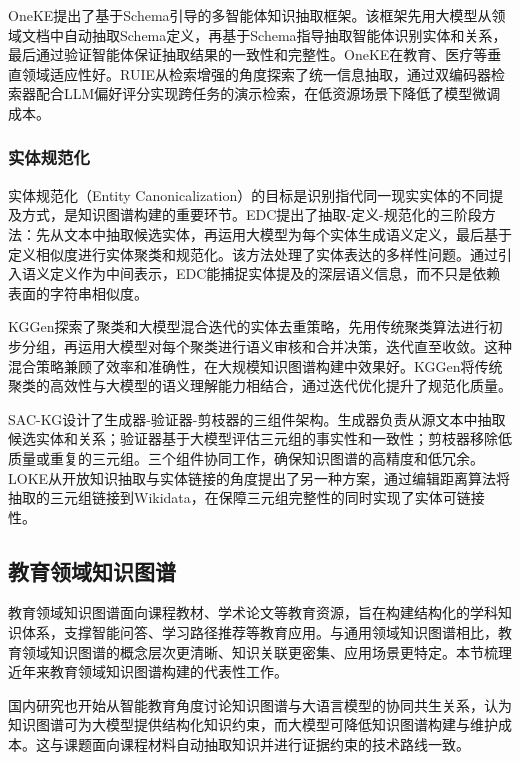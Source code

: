 OneKE提出了基于Schema引导的多智能体知识抽取框架\cite{oneke_2025}。该框架先用大模型从领域文档中自动抽取Schema定义，再基于Schema指导抽取智能体识别实体和关系，最后通过验证智能体保证抽取结果的一致性和完整性。OneKE在教育、医疗等垂直领域适应性好。RUIE\cite{ruie_2024}从检索增强的角度探索了统一信息抽取，通过双编码器检索器配合LLM偏好评分实现跨任务的演示检索，在低资源场景下降低了模型微调成本。

\subsubsection{实体规范化}

实体规范化（Entity Canonicalization）的目标是识别指代同一现实实体的不同提及方式，是知识图谱构建的重要环节。EDC提出了抽取-定义-规范化的三阶段方法\cite{edc_2024}：先从文本中抽取候选实体，再运用大模型为每个实体生成语义定义，最后基于定义相似度进行实体聚类和规范化。该方法处理了实体表达的多样性问题。通过引入语义定义作为中间表示，EDC能捕捉实体提及的深层语义信息，而不只是依赖表面的字符串相似度。

KGGen探索了聚类和大模型混合迭代的实体去重策略\cite{kggen_2025}，先用传统聚类算法进行初步分组，再运用大模型对每个聚类进行语义审核和合并决策，迭代直至收敛。这种混合策略兼顾了效率和准确性，在大规模知识图谱构建中效果好。KGGen将传统聚类的高效性与大模型的语义理解能力相结合，通过迭代优化提升了规范化质量。

SAC-KG设计了生成器-验证器-剪枝器的三组件架构\cite{sac_kg_2024}。生成器负责从源文本中抽取候选实体和关系；验证器基于大模型评估三元组的事实性和一致性；剪枝器移除低质量或重复的三元组。三个组件协同工作，确保知识图谱的高精度和低冗余。LOKE\cite{loke_2023}从开放知识抽取与实体链接的角度提出了另一种方案，通过编辑距离算法将抽取的三元组链接到Wikidata，在保障三元组完整性的同时实现了实体可链接性。

\subsection{教育领域知识图谱}

教育领域知识图谱面向课程教材、学术论文等教育资源，旨在构建结构化的学科知识体系，支撑智能问答、学习路径推荐等教育应用。与通用领域知识图谱相比，教育领域知识图谱的概念层次更清晰、知识关联更密集、应用场景更特定。本节梳理近年来教育领域知识图谱构建的代表性工作。

国内研究也开始从智能教育角度讨论知识图谱与大语言模型的协同共生关系，认为知识图谱可为大模型提供结构化知识约束，而大模型可降低知识图谱构建与维护成本\cite{lixiaoli2025_kg_llm_education_survey}。这与课题面向课程材料自动抽取知识并进行证据约束的技术路线一致。


